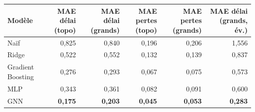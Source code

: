 \begin{tabular}{lrrrrr}
\toprule
Modèle & MAE délai (topo) & MAE délai (grands) & MAE pertes (topo) & MAE pertes (grands) & MAE délai (grands, év.) \\
\midrule
Naïf & 0{,}825 & 0{,}840 & 0{,}196 & 0{,}206 & 1{,}556 \\
Ridge & 0{,}522 & 0{,}552 & 0{,}132 & 0{,}139 & 0{,}837 \\
Gradient Boosting & 0{,}276 & 0{,}293 & 0{,}067 & 0{,}075 & 0{,}573 \\
MLP & 0{,}343 & 0{,}361 & 0{,}082 & 0{,}091 & 0{,}600 \\
GNN & \textbf{0{,}175} & \textbf{0{,}203} & \textbf{0{,}045} & \textbf{0{,}053} & \textbf{0{,}283} \\
\bottomrule
\end{tabular}